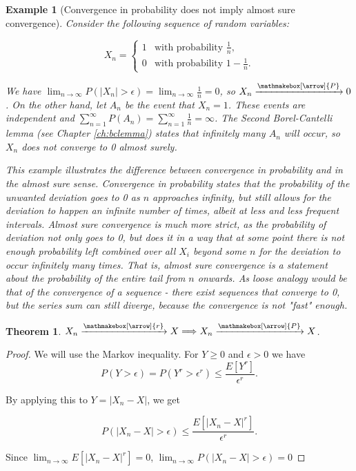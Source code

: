 \documentclass{book}
\theoremstyle{plain}%
\newtheorem{prototheorem}{Example}[section]
\newenvironment{cexample}
   {\colorlet{shadecolor}{gray!10}\begin{shaded}\begin{prototheorem}}
   {\end{prototheorem}\end{shaded}}
\newtheorem{theorem}{Theorem}[section]
\theoremstyle{definition}
\newlength{\arrow}
\newcommand*{\myrightarrow}[1]{\xrightarrow{\mathmakebox[\arrow]{#1}}}
\begin{document}
\begin{cexample}[Convergence in probability does not imply almost sure convergence]
Consider the following sequence of random variables:

$$
X_n =
\begin{cases}
1 & \text{with probability } \frac{1}{n},\\
0   & \text{with probability } 1-\frac{1}{n}.
\end{cases}
$$

We have $\lim_{n \rightarrow \infty} P(|X_n| > \epsilon) = \lim_{n \rightarrow \infty}\frac{1}{n} = 0$, so $X_n \myrightarrow{P} 0$. On the other hand, let $A_n$ be the event that $X_n = 1$. These events are independent and $\sum_{n=1}^\infty P(A_n) = \sum_{n=1}^\infty \frac{1}{n} = \infty$. The Second Borel-Cantelli lemma (see Chapter \ref{ch:bclemma}) states that infinitely many $A_n$ will occur, so $X_n$ does not converge to 0 almost surely.\label{ex:cip_asc}

This example illustrates the difference between convergence in probability and in the almost sure sense. Convergence in probability states that the probability of the unwanted deviation goes to 0 as $n$ approaches infinity, but still allows for the deviation to happen an infinite number of times, albeit at less and less frequent intervals. Almost sure convergence is much more strict, as the probability of deviation not only goes to 0, but does it in a way that at some point there is not enough probability left combined over all $X_i$ beyond some $n$ for the deviation to occur infinitely many times. That is, almost sure convergence is a statement about the probability of the entire tail from $n$ onwards. As loose analogy would be that of the convergence of a sequence - there exist sequences that converge to 0, but the series sum can still diverge, because the convergence is not "fast" enough.
\end{cexample}

\begin{theorem}
$X_n \myrightarrow{r} X \Longrightarrow X_n \myrightarrow{P} X$.\label{thm:cim_cip}
\end{theorem}

\begin{proof}
We will use the Markov inequality. For $Y \geq 0$ and $\epsilon > 0$ we have $$P(Y > \epsilon) = P(Y^r > \epsilon^r) \leq \frac{E[Y^r]}{\epsilon^r}.$$

By applying this to $Y = |X_n - X|$, we get

$$P(|X_n - X| > \epsilon) \leq \frac{E[|X_n - X|^r]}{\epsilon^r}.$$

Since $\lim_{n \rightarrow \infty} E[|X_n - X|^r] = 0$, $\lim_{n \rightarrow \infty} P(|X_n - X| > \epsilon) = 0$
\end{proof}
\end{document}
